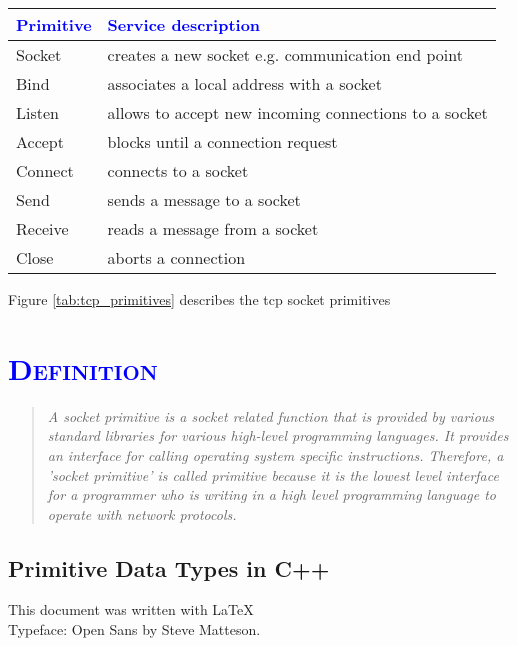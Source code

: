 \documentclass[xcolor=dvipsnames]{article}
\begin{document}
\begin{center}
\begin{tabular}{ | l | l | } 
\hline
\textcolor{blue}{Primitive} & \textcolor{blue}{Service description}\\
\hline
Socket & creates a new socket e.g. communication end point\\
Bind & associates a local address with a socket\\
Listen & allows to accept new incoming connections to a socket\\
Accept & blocks until a connection request\\
Connect & connects to a socket\\
Send & sends a message to a socket\\
Receive & reads a message from a socket\\
Close & aborts a connection\\
\hline
\end{tabular}
\end{center}
\label{tab:tcp_primitives}

Figure \ref{tab:tcp_primitives} describes the \gls{tcp} socket primitives \cite[p. 142, ch. 4.3.1]{tanenbaum}

\section{\scshape{\textcolor{blue}{Definition}}} \label{definition}

\begin{quote}

\textit{A socket primitive is a socket related function that is provided by various standard libraries for various high-level programming languages. It provides an interface for calling operating system specific instructions. Therefore, a 'socket primitive' is called primitive because it is the lowest level interface for a programmer who is writing in a high level programming language to operate with network protocols.}

\end{quote}

\begin{appendix}

\section{Primitive Data Types in C++}\label{c++_data_types}



\end{appendix}

\printnoidxglossaries

\newpage




\vfill
\begin{center}
This document was written with \LaTeX 
\\Typeface: Open Sans by Steve Matteson.
\end{center}

\end{document}
